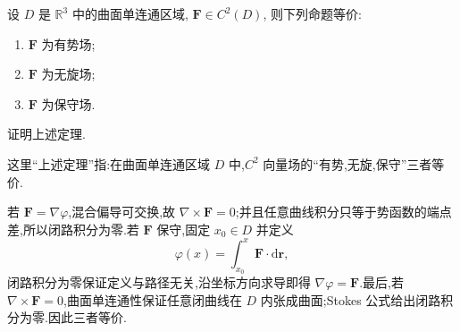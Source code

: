 \begin{theorem}[\markstar]
    设 $D$ 是 $\mathbb{R}^3$ 中的曲面单连通区域, $\bm F\in C^2(D)$, 则下列命题等价:
    \begin{enumerate}
        \item $\bm F$ 为有势场;
        \item $\bm F$ 为无旋场;
        \item $\bm F$ 为保守场.
    \end{enumerate}
\end{theorem}

\begin{example}
    证明上述定理.
\end{example}
\exampleblank

\begin{solution}
    这里``上述定理''指:在曲面单连通区域 $D$ 中,$C^2$ 向量场的``有势,无旋,保守''三者等价.

    若 $\bm F=\nabla\varphi$,混合偏导可交换,故 $\nabla\times\bm F=0$;并且任意曲线积分只等于势函数的端点差,所以闭路积分为零.若 $\bm F$ 保守,固定 $x_0\in D$ 并定义
    \[
        \varphi(x)=\int_{x_0}^{x}\bm F\cdot\mathrm{d}\bm r,
    \]
    闭路积分为零保证定义与路径无关,沿坐标方向求导即得 $\nabla\varphi=\bm F$.最后,若 $\nabla\times\bm F=0$,曲面单连通性保证任意闭曲线在 $D$ 内张成曲面;Stokes 公式给出闭路积分为零.因此三者等价.
\end{solution}
